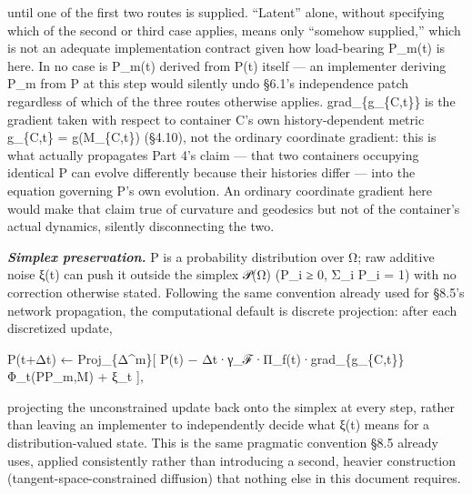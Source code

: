 \documentclass[
]{article}
\begin{document}
until one of the first two routes is supplied. ``Latent'' alone, without
specifying which of the second or third case applies, means only
``somehow supplied,'' which is not an adequate implementation contract
given how load-bearing P\_m(t) is here. In no case is P\_m(t) derived
from P(t) itself --- an implementer deriving P\_m from P at this step
would silently undo §6.1's independence patch regardless of which of the
three routes otherwise applies. grad\_\{g\_\{C,t\}\} is the gradient
taken with respect to container C's own history-dependent metric
g\_\{C,t\} = g(M\_\{C,t\}) (§4.10), not the ordinary coordinate
gradient: this is what actually propagates Part 4's claim --- that two
containers occupying identical P can evolve differently because their
histories differ --- into the equation governing P's own evolution. An
ordinary coordinate gradient here would make that claim true of
curvature and geodesics but not of the container's actual dynamics,
silently disconnecting the two.

\emph{\textbf{Simplex preservation.}} P is a probability distribution
over Ω; raw additive noise ξ(t) can push it outside the simplex 𝒫(Ω)
(P\_i ≥ 0, Σ\_i P\_i = 1) with no correction otherwise stated. Following
the same convention already used for §8.5's network propagation, the
computational default is discrete projection: after each discretized
update,

P(t+Δt) ← Proj\_\{Δ\^{}m\}{[} P(t) −
Δt·γ\_ℱ·Π\_f(t)·grad\_\{g\_\{C,t\}\}Φ\_t(P\textbar P\_m,M) + ξ\_t {]},

projecting the unconstrained update back onto the simplex at every step,
rather than leaving an implementer to independently decide what ξ(t)
means for a distribution-valued state. This is the same pragmatic
convention §8.5 already uses, applied consistently rather than
introducing a second, heavier construction (tangent-space-constrained
diffusion) that nothing else in this document requires.
\end{document}
